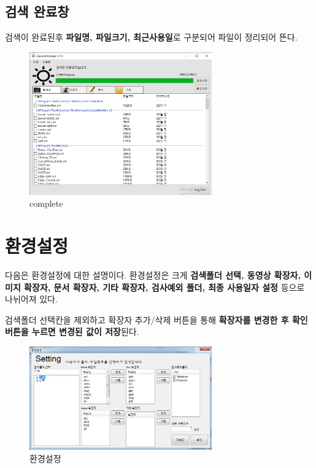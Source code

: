 \documentclass[a4paper, 13pt]{article} %
\begin{document}
		\subsection{검색 완료창}
		검색이 완료된후 \textbf{파일명, 파일크기, 최근사용일}로 구분되어 파일이 정리되어 뜬다.
	\begin{figure}[h]
		\centering
		\includegraphics[width=0.7\textwidth]{Figures/complete}
		\caption{complete}
		\label{fig:complete}
	\end{figure}

	\section{환경설정}
	다음은 환경설정에 대한 설명이다.	환경설정은 크게 \textbf{검색폴더 선택, 동영상 확장자, 이미지 확장자, 문서 확장자, 기타 확장자, 검사예외 폴더, 최종 사용일자 설정} 등으로 나뉘어져 있다.
	
	검색폴더 선택칸을 제외하고 확장자 추가/삭제 버튼을 통해 \textbf{확장자를 변경한 후 확인 버튼을 누르면 변경된 값이 저장}된다.
	
	\begin{figure}[h]
		\centering
		\includegraphics[width=0.7\textwidth]{Figures/Setting}
		\caption{환경설정}
		\label{fig:setting}
	\end{figure}
\end{document}
